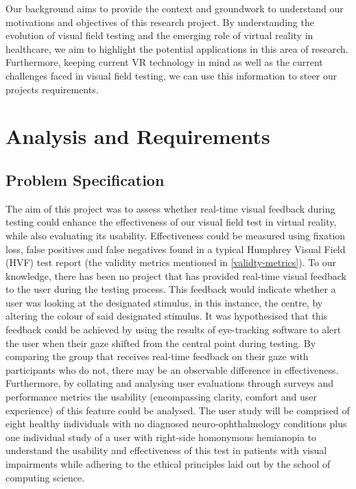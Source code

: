 \documentclass{l4proj}
\begin{document}
Our background aims to provide the context and groundwork to understand our motivations and objectives of this research project. By understanding the evolution of visual field testing and the emerging role of virtual reality in healthcare, we aim to highlight the potential applications in this area of research. Furthermore, keeping current VR technology in mind as well as the current challenges faced in visual field testing, we can use this information to steer our projects requirements.


\chapter{Analysis and Requirements}
\section{Problem Specification}
The aim of this project was to assess whether real-time visual feedback during testing could enhance the effectiveness of our visual field test in virtual reality, while also evaluating its usability. Effectiveness could be measured using fixation loss, false positives and false negatives found in a typical Humphrey Visual Field (HVF) test report (the validity metrics mentioned in \ref{validty-metrics}). To our knowledge, there has been no project that has provided real-time visual feedback to the user during the testing process. This feedback would indicate whether a user was looking at the designated stimulus, in this instance, the centre, by altering the colour of said designated stimulus. It was hypothesised that this feedback could be achieved by using the results of eye-tracking software to alert the user when their gaze shifted from the central point during testing. By comparing the group that receives real-time feedback on their gaze with participants who do not, there may be an observable difference in effectiveness. Furthermore, by collating and analysing user evaluations through surveys and performance metrics the usability (encompassing clarity, comfort and user experience) of this feature could be analysed. The user study will be comprised of eight healthy individuals with no diagnosed neuro-ophthalmology conditions plus one individual study of a user with right-side homonymous hemianopia to understand the usability and effectiveness of this test in patients with visual impairments while adhering to the ethical principles laid out by the school of computing science.
\end{document}
